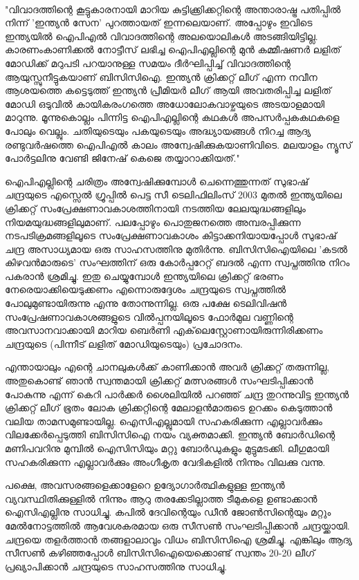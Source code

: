 \vskip 2pt

‌\begin{framed}
"വിവാദത്തിന്റെ കൂട്ടുകാരനായി മാറിയ കുട്ടിക്ക്രിക്കറ്റിന്റെ അന്താരാഷ്ട്ര പതിപ്പില്‍ നിന്ന് 'ഇന്ത്യന്‍ സേന' പുറത്തായത് 
ഇന്നലെയാണ്. അപ്പോഴും ഇവിടെ ഇന്ത്യയില്‍ ഐപിഎല്‍ വിവാദത്തിന്റെ അലയൊലികള്‍ അടങ്ങിയിട്ടില്ല. 
കാരണംകാണിക്കല്‍ നോട്ടീസ് ലഭിച്ച ഐപിഎല്ലിന്റെ മുന്‍ കമ്മീഷണര്‍ ലളിത് മോഡിക്ക് മറുപടി പറയാനുള്ള 
സമയം ദീര്‍ഘിപ്പിച്ച് വിവാദത്തിന്റെ ആയുസ്സുനീട്ടുകയാണ് ബിസിസിഐ. ഇന്ത്യന്‍ ക്രിക്കറ്റ് ലീഗ് എന്ന നവീന 
ആശയത്തെ കട്ടെടുത്ത് ഇന്ത്യന്‍ പ്രീമിയര്‍ ലീഗ് ആയി അവതരിപ്പിച്ച ലളിത് മോഡി ഒടുവില്‍ കായികരംഗത്തെ 
അധോലോകവാഴ്ചയുടെ അടയാളമായി മാറുന്നു. മൂന്നുകൊല്ലം പിന്നിട്ട ഐപിഎല്ലിന്റെ കഥകള്‍ അപസര്‍പ്പകകഥകളെ 
പോലും വെല്ലും. ചതിയുടെയും പകയുടെയും അദ്ധ്യായങ്ങള്‍ നിറച്ച ആദ്യ രണ്ടുവര്‍ഷത്തെ ഐപിഎല്‍ കാലം 
അന്വേഷിക്കുകയാണിവിടെ.  മലയാളം ന്യൂസ് പോര്‍ട്ടലിനു വേണ്ടി ജിനേഷ് കെജെ തയ്യാറാക്കിയത്."
\end{framed}

{\vskip 12pt}

ഐപിഎല്ലിന്റെ ചരിത്രം അന്വേഷിക്കുമ്പോള്‍ ചെന്നെത്തുന്നത് സുഭാഷ് ചന്ദ്രയുടെ എസ്സെല്‍ ഗ്രൂപ്പില്‍ പെട്ട സീ ടെലിഫിലിംസ് 
2003 മുതല്‍ ഇന്ത്യയിലെ ക്രിക്കറ്റ് സംപ്രേക്ഷണാവകാശത്തിനായി നടത്തിയ ലേലയുദ്ധങ്ങളിലും നിയമയുദ്ധങ്ങളിലുമാണ്. 
പലപ്പോഴും പൊതുജനത്തെ അമ്പരപ്പിക്കുന്ന നടപടിക്രമങ്ങളിലൂടെ സംപ്രേക്ഷണാവകാശം കിട്ടാക്കനിയായപ്പോള്‍ 
സുഭാഷ് ചന്ദ്ര അസാധ്യമായ ഒരു സാഹസത്തിനു മുതിര്‍ന്നു. ബിസിസിഐയിലെ 'കടല്‍ കിഴവന്‍മാരുടെ' സംഘത്തിന് 
ഒരു കോര്‍പ്പറേറ്റ് ബദല്‍ എന്ന സ്വപ്നത്തിനു നിറം പകരാന്‍ ശ്രമിച്ചു. ഇതു ചെയ്യുമ്പോള്‍ ഇന്ത്യയിലെ ക്രിക്കറ്റ് ഭരണം 
നേരെയാക്കിയെടുക്കണം എന്നൊരുദ്ദേശം ചന്ദ്രയുടെ സ്വപ്നത്തില്‍ പോലുമുണ്ടായിരുന്നു എന്നു തോന്നുന്നില്ല. ഒരു പക്ഷേ 
ടെലിവിഷന്‍ സംപ്രേഷണാവകാശങ്ങളുടെ വില്‍പ്പനയിലൂടെ ഫോര്‍മുല വണ്ണിന്റെ അവസാനവാക്കായി മാറിയ ബെര്‍ണി 
എക്‌ലെസ്റ്റോണായിരുന്നിരിക്കണം ചന്ദ്രയുടെ (പിന്നീട് ലളിത് മോഡിയുടെയും) പ്രചോദനം.

എന്തായാലും എന്റെ ചാനലുകള്‍ക്ക് കാണിക്കാന്‍ അവര്‍ ക്രിക്കറ്റ് തരുന്നില്ല, അതുകൊണ്ട് ഞാന്‍ സ്വന്തമായി 
ക്രിക്കറ്റ് മത്സരങ്ങള്‍ സംഘടിപ്പിക്കാന്‍ പോകുന്നു എന്ന് കെറി പാര്‍ക്കര്‍ ശൈലിയില്‍ പറഞ്ഞ് ചന്ദ്ര തുറന്നുവിട്ട ഇന്ത്യന്‍ 
ക്രിക്കറ്റ് ലീഗ് ഭൂതം ലോക ക്രിക്കറ്റിന്റെ മേലാളന്‍മാരുടെ ഉറക്കം കെടുത്താന്‍ വലിയ താമസമുണ്ടായില്ല. ഐസിഎല്ലുമായി 
സഹകരിക്കുന്ന എല്ലാവര്‍ക്കും വിലക്കേര്‍പ്പെടുത്തി ബിസിസിഐ നയം വ്യക്തമാക്കി. ഇന്ത്യന്‍ ബോര്‍ഡിന്റെ മണിപവറിനു 
മുമ്പില്‍ ഐസിസിയും മറ്റു ബോര്‍ഡുകളും മുട്ടുമടക്കി. ലീഗുമായി സഹകരിക്കുന്ന എല്ലാവര്‍ക്കും അംഗീകൃത വേദികളില്‍ നിന്നും 
വിലക്കു വന്നു.

പക്ഷെ, അവസരങ്ങളെക്കാളേറെ ഉദ്യോഗാര്‍ത്ഥികളുള്ള ഇന്ത്യന്‍ വ്യവസ്ഥിതിക്കുള്ളില്‍ നിന്നും ആറു തരക്കേടില്ലാത്ത 
ടീമുകളെ ഉണ്ടാക്കാന്‍ ഐസിഎല്ലിനു സാധിച്ചു. കപില്‍ ദേവിന്റെയും ഡീന്‍ ജോണ്‍സിന്റെയും മറ്റും മേല്‍നോട്ടത്തില്‍ 
ആവേശകരമായ ഒരു സീസണ്‍ സംഘടിപ്പിക്കാന്‍ ചന്ദ്രയ്ക്കായി. ചന്ദ്രയെ തളര്‍ത്താന്‍ തങ്ങളാലാവും വിധം ബിസിസിഐ 
ശ്രമിച്ചു. എങ്കിലും ആദ്യ സീസണ്‍ കഴിഞ്ഞപ്പോള്‍ ബിസിസിഐയെക്കൊണ്ട് സ്വന്തം 20-20 ലീഗ് പ്രഖ്യാപിക്കാന്‍ ചന്ദ്രയുടെ 
സാഹസത്തിനു സാധിച്ചു.


